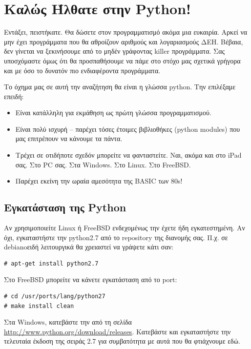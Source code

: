 \section{Καλώς Ήλθατε στην Python!}
%
Εντάξει, πειστήκατε. Θα δώσετε στον προγραμματισμό ακόμα μια ευκαιρία. Αρκεί
να μην έχει προγράμματα που θα αθροίζουν αριθμούς και λογαριασμούς ΔΕΗ. Βέβαια,
δεν γίνεται να ξεκινήσουμε από το μηδέν γράφοντας killer προγράμματα. Σας
υποσχόμαστε όμως ότι θα προσπαθήσουμε να πάμε στο στόχο μας σχετικά γρήγορα
και με όσο το δυνατόν πιο ενδιαφέροντα προγράμματα.

Το όχημα μας σε αυτή την αναζήτηση θα είναι η γλώσσα python. Την επιλέξαμε
επειδή:
%
\begin{itemize}
\item Είναι κατάλληλη για εκμάθηση ως πρώτη γλώσσα προγραμματισμού.
\item Είναι πολύ ισχυρή -- παρέχει τόσες έτοιμες βιβλιοθήκες (python modules) που μας επιτρέπουν να κάνουμε τα πάντα.
\item Τρέχει σε οτιδήποτε σχεδόν μπορείτε να φανταστείτε. Ναι, ακόμα και στο iPad σας. Στο PC σας. Στα Windows. Στο Linux. Στο FreeBSD.
\item Παρέχει εκείνη την ωραία αμεσότητα της BASIC των 80s!
\end{itemize}
%
\subsection{Εγκατάσταση της Python}
%
Αν χρησιμοποιείτε Linux ή FreeBSD ενδεχομένως την έχετε ήδη εγκατεστημένη.
Αν όχι, εγκαταστήστε την python2.7 από το repository της διανομής σας. Π.χ.
σε debianoειδή λειτουργικά θα χρειαστεί να γράψετε κάτι σαν:
%
\begin{verbatim}
# apt-get install python2.7
\end{verbatim}
%
Στο FreeBSD μπορείτε να κάνετε εγκατάσταση από το port:
%
\begin{verbatim}
# cd /usr/ports/lang/python27
# make install clean
\end{verbatim}
%
Στα Windows, κατεβάστε την από τη σελίδα
\url{http://www.python.org/download/releases}. Κατεβάστε και εγκαταστήστε την
τελευταία έκδοση της σειράς 2.7 για συμβατότητα με αυτά που θα φτιάχνουμε
εδώ.
%
